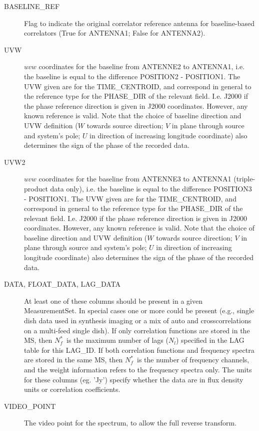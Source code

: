 \documentclass{article}
\newcommand{\nfs}{$N_f^*$}
\newcommand{\nl}{$N_l$}
\begin{document}
\begin{itemize}
\begin{description}
\item[BASELINE\_REF] Flag to indicate the original correlator
reference antenna for baseline-based correlators (True for ANTENNA1;
False for ANTENNA2).

\item[UVW] $uvw$ coordinates for the baseline from ANTENNE2 to ANTENNA1,
   i.e. the
   baseline is equal to the difference POSITION2 - POSITION1. The UVW given
   are for the TIME\_CENTROID, and correspond in general to the reference type
   for the PHASE\_DIR of the relevant field. I.e. J2000 if the phase reference
   direction is given in J2000 coordinates. However, any known reference is
   valid.
   Note that the choice of baseline direction and UVW definition ($W$ towards
   source direction; $V$ in plane through source and system's pole; $U$ in
   direction of increasing longitude coordinate) also determines the sign of
   the phase of the recorded data.

\item[UVW2] $uvw$ coordinates for the baseline from ANTENNE3 to ANTENNA1
   (triple-product data only), i.e. the
   baseline is equal to the difference POSITION3 - POSITION1. The UVW given
   are for the TIME\_CENTROID, and correspond in general to the reference type
   for the PHASE\_DIR of the relevant field. I.e. J2000 if the phase reference
   direction is given in J2000 coordinates. However, any known reference is
   valid.
   Note that the choice of baseline direction and UVW definition ($W$ towards
   source direction; $V$ in plane through source and system's pole; $U$ in
   direction of increasing longitude coordinate) also determines the sign of
   the phase of the recorded data.

\item[DATA, FLOAT\_DATA, LAG\_DATA] At least one of these columns
should be present in a given MeasurementSet. In special cases one or
more could be present (e.g., single dish data used in synthesis
imaging or a mix of auto and crosscorrelations on a multi-feed single
dish). If only correlation functions are stored in the MS, then \nfs\
is the maximum number of lags (\nl) specified in the LAG table for
this LAG\_ID.  If both correlation functions and frequency spectra are
stored in the same MS, then \nfs\ is the number of frequency channels,
and the weight information refers to the frequency spectra only. The
units for these columns (eg. 'Jy') specify whether the data are in
flux density units or correlation coefficients.

\item[VIDEO\_POINT] The video point for the spectrum, to allow the
full reverse transform.


\end{description}
\end{itemize}
\end{document}
